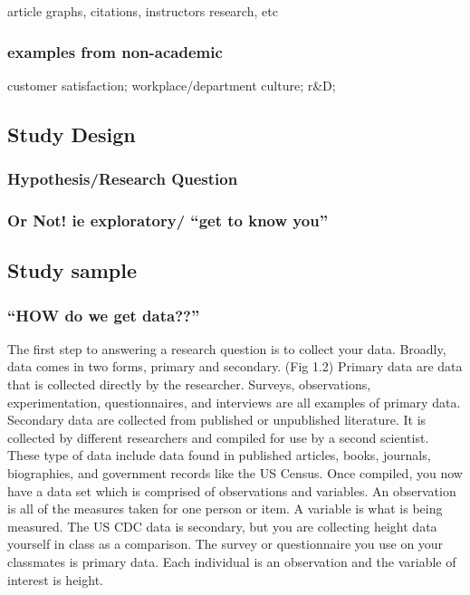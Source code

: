 \documentclass[
]{book}
\begin{document}
article graphs, citations, instructors research, etc

\hypertarget{examples-from-non-academic}{%
\subsubsection{examples from non-academic}\label{examples-from-non-academic}}

customer satisfaction; workplace/department culture; r\&D;

\hypertarget{study-design}{%
\subsection{Study Design}\label{study-design}}

\hypertarget{hypothesisresearch-question}{%
\subsubsection{Hypothesis/Research Question}\label{hypothesisresearch-question}}

\hypertarget{or-not-ie-exploratory-get-to-know-you}{%
\subsubsection{Or Not! ie exploratory/ ``get to know you''}\label{or-not-ie-exploratory-get-to-know-you}}

\hypertarget{study-sample}{%
\subsection{Study sample}\label{study-sample}}

\hypertarget{how-do-we-get-data}{%
\subsubsection{``HOW do we get data??''}\label{how-do-we-get-data}}

The first step to answering a research question is to collect your data. Broadly, data comes in two forms, primary and secondary. (Fig 1.2) Primary data are data that is collected directly by the researcher. Surveys, observations, experimentation, questionnaires, and interviews are all examples of primary data. Secondary data are collected from published or unpublished literature. It is collected by different researchers and compiled for use by a second scientist. These type of data include data found in published articles, books, journals, biographies, and government records like the US Census.
Once compiled, you now have a data set which is comprised of observations and variables. An observation is all of the measures taken for one person or item. A variable is what is being measured.
The US CDC data is secondary, but you are collecting height data yourself in class as a comparison. The survey or questionnaire you use on your classmates is primary data. Each individual is an observation and the variable of interest is height.
\end{document}
